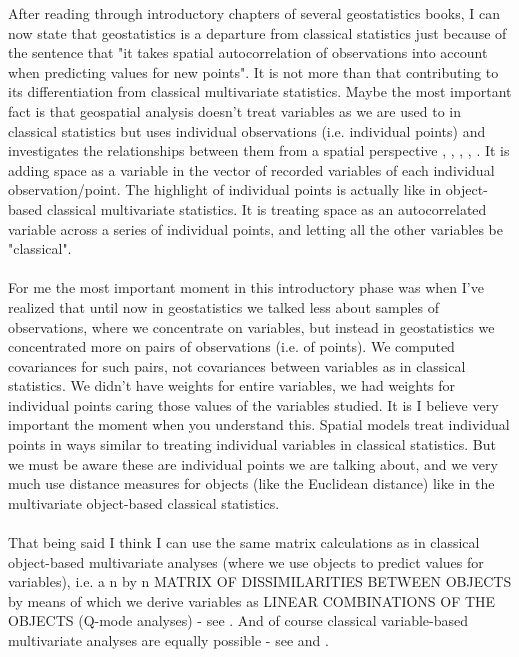 \documentclass {article}
\begin{document}
After reading through introductory chapters of several geostatistics books, I can now state that geostatistics is a departure from classical statistics just because of the sentence that "it takes spatial autocorrelation of observations into account when predicting values for new points". It is not more than that contributing to its differentiation from classical multivariate statistics.
Maybe the most important fact is that geospatial analysis doesn't treat variables as we are used to in classical statistics but uses individual observations (i.e. individual points) and investigates the relationships between them from a spatial perspective \cite{cressie_statistics_1993}, \cite{webster_geostatistics_2007}, \cite{isaaks_applied_1989}, \cite{hengl_practical_2009}, \cite{johnston_using_2003}.
 It is adding space as a variable in the vector of recorded variables of each individual observation/point. The highlight of individual points is actually like in object-based classical multivariate statistics. It is treating space as an autocorrelated variable across a series of individual points, and letting all the other variables be "classical". 
\\
\\
For me the most important moment in this introductory phase was when I've realized that until now  in geostatistics we talked less about samples of observations, where we concentrate on variables, but instead in geostatistics we concentrated more on pairs of observations (i.e. of points). 
We computed covariances for such pairs, not covariances between variables as in classical statistics. We didn't have weights for entire variables, we had weights for individual points caring those values of the variables studied. 
It is I believe very important the moment when you understand this. Spatial models treat individual points in ways similar to treating individual variables in classical statistics. But we must be aware these are individual points we are talking about, and we very much use distance measures for objects (like the Euclidean distance) like in the multivariate object-based classical statistics.
\\
\\
That being said I think I can use the same matrix calculations as in classical object-based multivariate analyses (where we use objects to predict values for variables), i.e. a n by n MATRIX OF DISSIMILARITIES BETWEEN OBJECTS by means of which we derive variables as LINEAR COMBINATIONS OF THE OBJECTS (Q-mode analyses) - see \cite{quinn_experimental_2002}.  
And of course classical variable-based multivariate analyses are equally possible - see \cite{quinn_experimental_2002} and \cite{carroll_mathematical_1997}. 
\end{document}
